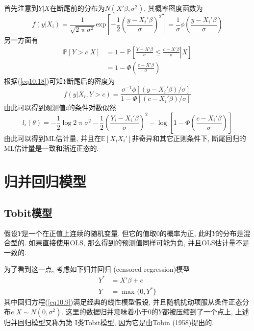 \documentclass[cn, 12pt, math=mtpro2, bibstyle=apa, blue, twocol]{elegantbook}
\newcommand{\E}{\mathbb{E}}
\newcommand{\PP}{\mathbb{P}}
\begin{document}
首先注意到$Y|X$在断尾前的分布为$N(X'\beta,\sigma^2)$, 其概率密度函数为
$$f(y|X_i)=\frac{1}{\sqrt{2\uppi\sigma^2}}\text{exp}\left[-\frac{1}{2}\left(\frac{y-X_i'\beta}{\sigma}\right)^2\right]=\frac{1}{\sigma}\phi\left(\frac{y-X_i'\beta}{\sigma}\right)$$
另一方面有
\begin{align*}
\PP[Y>c|X]&=1-\PP\left[\left.\frac{Y-X'\beta}{\sigma}\leq\frac{c-X'\beta}{\sigma}\right|X\right] \\
&=1-\Phi\left(\frac{c-X'\beta}{\sigma}\right)
\end{align*}
根据(\ref{eq10.18})可知$Y$断尾后的密度为
$$f(y|X_i,Y>c)=\frac{\sigma^{-1}\phi[(y-X_i'\beta)/\sigma]}{1-\Phi[(c-X_i'\beta)/\sigma]}$$
由此可以得到观测值$i$的条件对数似然
$$l_i(\theta)=-\frac{1}{2}\log2\uppi\sigma^2-\frac{1}{2}\left(\frac{Y_i-X_i'\beta}{\sigma}\right)^2-\log\left[1-\Phi\left(\frac{c-X_i'\beta}{\sigma}\right)\right]$$
由此可以得到ML估计量, 并且在$\E[X_iX_i']$非奇异和其它正则条件下, 断尾回归的ML估计量是一致和渐近正态的.
\section{归并回归模型}
\subsection{Tobit模型}
假设$Y$是一个在正值上连续的随机变量, 但它的值取0的概率为正, 此时$Y$的分布是混合型的. 如果直接使用OLS, 那么得到的预测值同样可能为负, 并且OLS估计量不是一致的.

为了看到这一点, 考虑如下归并回归 (censored regression)模型
\begin{align}
Y^\ast&=X'\beta+e \label{eq10.9} \\
Y&=\max\{0,Y^\ast\} \nonumber
\end{align}
其中回归方程(\ref{eq10.9})满足经典的线性模型假设, 并且随机扰动项服从条件正态分布$e|X\sim N(0,\sigma^2)$. 这里的数据归并意味着小于0的$Y$都被压缩到了一个点上, 上述归并回归模型又称为第 I类Tobit模型, 因为它是由Tobin (1958)提出的.
\end{document}
